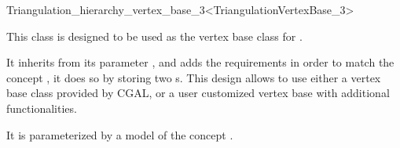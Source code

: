 

\begin{ccRefClass}{Triangulation_hierarchy_vertex_base_3<TriangulationVertexBase_3>}

\ccDefinition
  
This class is designed to be used as the vertex base class for
.

It inherits from its parameter , and adds the
requirements in order to match the concept
, it does so by storing two
s.  This design allows to use either a vertex base class
provided by CGAL, or a user customized vertex base with additional
functionalities.


\ccParameters

It is parameterized by a model of the concept .

\ccIsModel {}

\ccInheritsFrom {}


\ccSeeAlso
{}\\

\end{ccRefClass}
